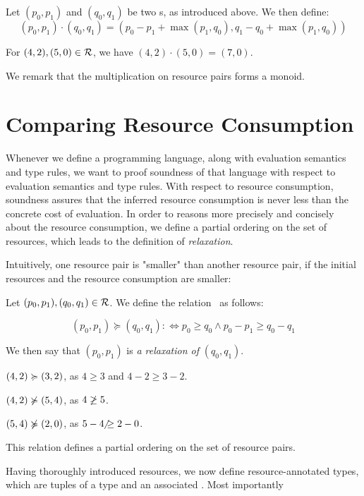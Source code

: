 \begin{definition}
   \label{def:multiplying-pairs}
   Let \((p_0, p_1)\) and \((q_0, q_1)\) be two s, as introduced above. We then define:
   \[(p_0, p_1) \cdot (q_0, q_1) = (p_0 - p_1 + \max(p_1, q_0), q_1 - q_0 + \max(p_1, q_0))\]
\end{definition}

\begin{example}
   For \((4, 2), (5,0) \in \mathcal{R}\), we have \((4, 2) \cdot (5, 0) = (7,0)\).
\end{example}

We remark that the multiplication on resource pairs forms a monoid.

\section{Comparing Resource Consumption}

Whenever we define a programming language, along with evaluation semantics and type rules, we want to proof soundness of that language with respect to evaluation semantics and type rules. With respect to resource consumption, soundness assures that the inferred resource consumption is never less than the concrete cost of evaluation. In order to reasons more precisely and concisely about the resource consumption, we define a partial ordering on the set of resources, which leads to the definition of \emph{relaxation}.

Intuitively, one resource pair is "smaller" than another resource pair, if the initial resources and the resource consumption are smaller:

\begin{definition}
   Let \((p_0, p_1), (q_0, q_1) \in \mathcal{R}\). We define the relation \relaxation ~as follows:

   \[
      (p_0, p_1) \succcurlyeq (q_0, q_1) :\iff p_0 \geq q_0 \wedge p_0 - p_1 \geq q_0 - q_1
   \]
\end{definition}

We then say that \((p_0, p_1)\) is \emph{a relaxation of} \((q_0, q_1)\).

\begin{example}
   \((4, 2) \succcurlyeq (3, 2)\), as \(4 \geq 3\) and \(4 - 2 \geq 3 - 2\).
\end{example}

\begin{example}
   \((4,2) \notrelaxation (5, 4)\), as \(4 \centernot \geq 5\).
\end{example}

\begin{example}
   \((5, 4) \notrelaxation (2, 0)\), as \(5 - 4 \centernot \geq 2 - 0\).
\end{example}

This relation defines a partial ordering on the set of resource pairs.

Having thoroughly introduced resources, we now define resource-annotated types, which are tuples of a type and an associated . Most importantly

